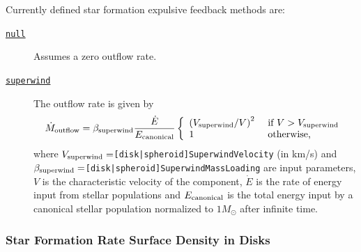 Currently defined star formation expulsive feedback methods are:
\begin{description}
 \item [\hyperlink{star_formation.feedback_expulsion.spheroids.null.F90:star_formation_expulsive_feedback_spheroids_null:star_formation_expulsive_feedback_spheroid_outflow_rate_null}{{\tt null}}] Assumes a zero outflow rate.
 \item [\hyperlink{star_formation.feedback_expulsion.spheroids.superwind.F90:star_formation_expulsive_feedback_spheroids_superwind:star_formation_expulsive_feedback_spheroid_outflow_rate_sw}{{\tt superwind}}] The outflow rate is given by
\begin{equation}
 \dot{M}_{\rm outflow} = \beta_{\rm superwind} {\dot{E} \over E_{\rm canonical}} \left\{ \begin{array}{ll} \left( V_{\rm superwind}/V\right)^2 & \hbox{ if } V > V_{\rm superwind} \\ 1 & \hbox{ otherwise,} \end{array} \right.
\end{equation}
where $V_{\rm superwind}=${\tt [disk|spheroid]SuperwindVelocity} (in km/s) and $\beta_{\rm superwind}=${\tt [disk|spheroid]SuperwindMassLoading} are input parameters, $V$ is the characteristic velocity of the component, $\dot{E}$ is the rate of energy input from stellar populations and $E_{\rm canonical}$ is the total energy input by a canonical stellar population normalized to $1 M_\odot$ after infinite time.
\end{description}

\subsubsection{Star Formation Rate Surface Density in Disks}

